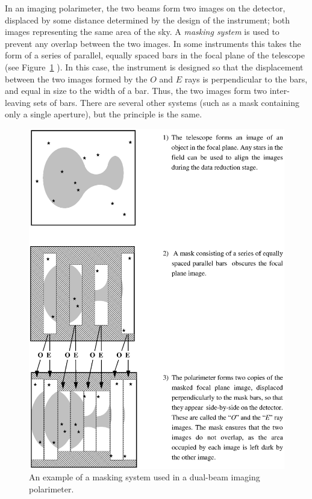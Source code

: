 \documentclass[twoside,11pt]{article}
\newenvironment{latexonly}{}{}
\newcommand{\latex}[1]{#1}
\newcommand{\html}[1]{}
\renewcommand{\_}{\texttt{\symbol{95}}}
\begin{document}
In an imaging polarimeter, the two beams form two images on the detector,
displaced by some distance determined by the design of the instrument;
both images representing the same area of the sky. A \emph{masking system}
is used to prevent any overlap between the two images. In some
instruments this takes the form of a series of parallel, equally spaced
bars in the focal plane of the telescope (see 
\latex{Figure~\ref{fig:grids}} \html{the next figure}). In
this case, the instrument is designed so that the displacement between
the two images formed by the $O$ and $E$ rays is perpendicular to the
bars, and equal in size to the width of a bar. Thus, the two images form
two inter-leaving sets of bars. There are several other systems (such as 
a mask containing only a single aperture), but the principle is the same.

\begin{latexonly}
  \begin{figure}[p]
  \begin{center}
  \includegraphics[clip,scale=0.8]{sun223_figures/grids.eps}
  \caption{An example of a masking system used in a dual-beam imaging polarimeter.}
  \label{fig:grids}
  \end{center}
  \end{figure}
\end{latexonly}
\end{document}
